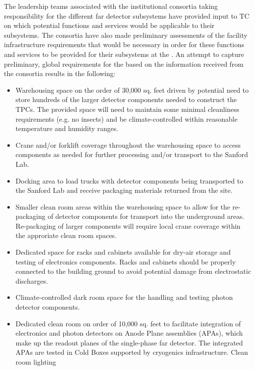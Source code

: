 The leadership teams associated with the  institutional
consortia taking responsibility for the different far detector
subsystems have provided input to TC on which potential 
functions and services would be applicable to their subsystems.  The
consortia have also made preliminary assessments of the facility
infrastructure requirements that would be necessary in order for these
functions and services to be provided for their subsystems at the
.  An attempt to capture preliminary, global requirements
for the  based on the information received from the
consortia results in the following:
\begin{itemize}
  \item Warehousing space on the order of 30,000 sq. feet driven by
    potential need to store hundreds of the larger detector components
    needed to construct the TPCs.  The provided space will need to
    maintain some minimal cleanliness requirements (e.g. no insects)
    and be climate-controlled within reasonable temperature and
    humidity ranges.
  \item Crane and/or forklift coverage throughout the warehousing
    space to access components as needed for further processing and/or
    transport to the Sanford Lab.
  \item Docking area to load trucks with detector components being
    transported to the Sanford Lab and receive packaging materials
    returned from the site.
  \item Smaller clean room areas within the warehousing space to
    allow for the re-packaging of detector components for transport
    into the underground areas.  Re-packaging of larger components
    will require local crane coverage within the approriate clean room
    spaces.
  \item Dedicated space for racks and cabinets available for dry-air
    storage and testing of electronics components.  Racks and cabinets
    should be properly connected to the building ground to avoid
    potential damage from electrostatic discharges.
  \item Climate-controlled dark room space for the handling and
    testing photon detector components.
  \item Dedicated clean room on order of 10,000 sq. feet to facilitate
    integration of electronics and photon detectors on Anode Plane
    assemblies (APAs), which make up the readout planes of the
    single-phase far detector. The integrated APAs are tested in Cold
    Boxes supported by cryogenics infrastructure.  Clean room lighting

\end{itemize}
